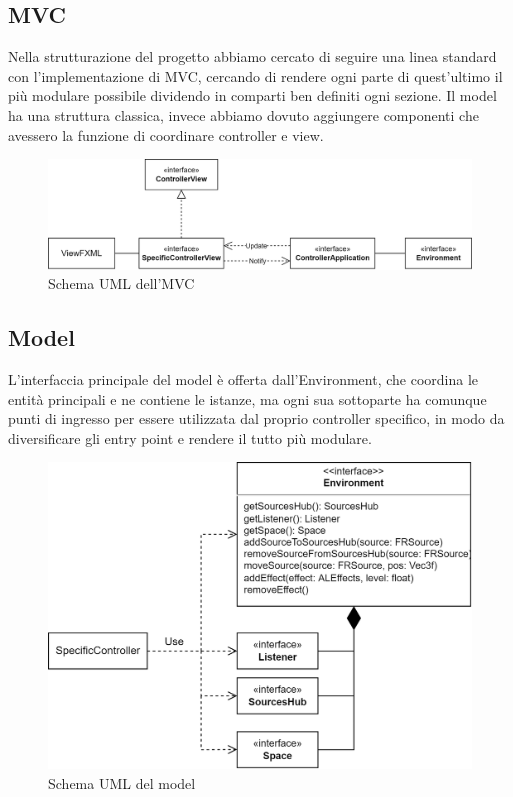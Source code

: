 \documentclass[a4paper,12pt]{report}
\begin{document}
\subsection*{MVC}
Nella strutturazione del progetto abbiamo cercato di seguire una linea standard con l'implementazione di MVC, cercando di rendere ogni parte di quest'ultimo il più modulare possibile dividendo in comparti ben definiti ogni sezione. Il model ha una struttura classica, invece abbiamo dovuto aggiungere componenti che avessero la funzione di coordinare controller e view.
%
\begin{figure}[H]
\centering{}
\includegraphics[width=\textwidth]{img/architecture/architecture.png}
\caption{Schema UML dell'MVC}
\label{img:analysis}
\end{figure}
%
\subsection*{Model}
L'interfaccia principale del model è offerta dall'Environment, che coordina le entità principali e ne contiene le istanze, ma ogni sua sottoparte ha comunque punti di ingresso per essere utilizzata dal proprio controller specifico, in modo da diversificare gli entry point e rendere il tutto più modulare.
%
\begin{figure}[H]
\centering{}
\includegraphics[width=\textwidth]{img/architecture/model.png}
\caption{Schema UML del model}
\label{img:analysis}
\end{figure}
%
\end{document}
